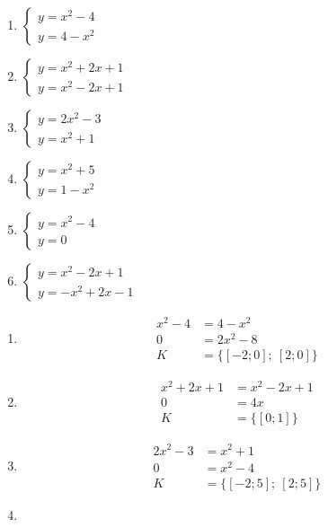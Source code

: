 \documentclass[11pt,a4paper]{article}
\begin{document}
\begin{zadaniReseniBox}[title={Domácí úkol}]
\begin{enumerate}[label=\alph*),itemsep=2pt]
\item $\begin{cases}y=x^{2} - 4\\y=4 - x^{2}\end{cases}$
\item $\begin{cases}y=x^{2} + 2x + 1\\y=x^{2} - 2x + 1\end{cases}$
\item $\begin{cases}y=2x^{2} - 3\\y=x^{2} + 1\end{cases}$
\item $\begin{cases}y=x^{2} + 5\\y=1 - x^{2}\end{cases}$
\item $\begin{cases}y=x^{2} - 4\\y=0\end{cases}$
\item $\begin{cases}y=x^{2} - 2x + 1\\y=- x^{2} + 2x - 1\end{cases}$
\end{enumerate}
\tcblower
\begin{enumerate}[label=\alph*),itemsep=2pt]
\item
\[\begin{aligned}
x^{2} - 4&=4 - x^{2}\\[2pt]
0&=2x^{2} - 8\\[2pt]
K&=\{[-2;0];\ [2;0]\}
\end{aligned}\]
\item
\[\begin{aligned}
x^{2} + 2x + 1&=x^{2} - 2x + 1\\[2pt]
0&=4x\\[2pt]
K&=\{[0;1]\}
\end{aligned}\]
\item
\[\begin{aligned}
2x^{2} - 3&=x^{2} + 1\\[2pt]
0&=x^{2} - 4\\[2pt]
K&=\{[-2;5];\ [2;5]\}
\end{aligned}\]
\item

\end{enumerate}
\end{zadaniReseniBox}
\end{document}
